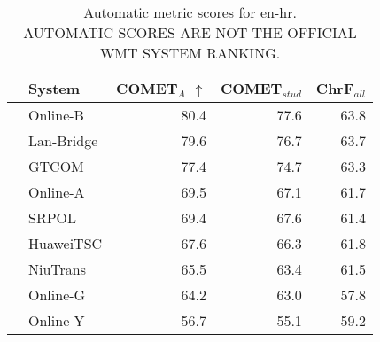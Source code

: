 \begin{table}
\centering
\caption{Automatic metric scores for en-hr. \\AUTOMATIC SCORES ARE NOT THE OFFICIAL WMT SYSTEM RANKING.}
\begin{tabular}{llrrr}
\toprule
          &      System &  COMET$_{A}$ $\uparrow$ &  COMET$_{stud}$ &  ChrF$_{all}$ \\
\midrule
 \Uncon{} &    Online-B &                    80.4 &            77.6 &          63.8 \\
 \Uncon{} &  Lan-Bridge &                    79.6 &            76.7 &          63.7 \\
 \Uncon{} &       GTCOM &                    77.4 &            74.7 &          63.3 \\
 \Uncon{} &    Online-A &                    69.5 &            67.1 &          61.7 \\
 \Const{} &       SRPOL &                    69.4 &            67.6 &          61.4 \\
 \Const{} &   HuaweiTSC &                    67.6 &            66.3 &          61.8 \\
 \Const{} &    NiuTrans &                    65.5 &            63.4 &          61.5 \\
 \Uncon{} &    Online-G &                    64.2 &            63.0 &          57.8 \\
 \Uncon{} &    Online-Y &                    56.7 &            55.1 &          59.2 \\
\bottomrule
\end{tabular}
\end{table}



